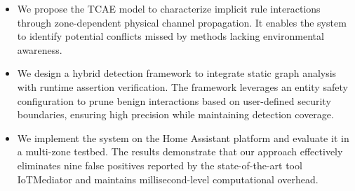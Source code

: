 \begin{itemize}
	\item We propose the TCAE model to characterize implicit rule interactions through zone-dependent physical channel propagation. It enables the system to identify potential conflicts missed by methods lacking environmental awareness.
	
	\item We design a hybrid detection framework to integrate static graph analysis with runtime assertion verification. The framework leverages an entity safety configuration to prune benign interactions based on user-defined security boundaries, ensuring high precision while maintaining detection coverage.
	
	\item We implement the system on the Home Assistant platform and evaluate it in a multi-zone testbed. The results demonstrate that our approach effectively eliminates nine false positives reported by the state-of-the-art tool IoTMediator and maintains millisecond-level computational overhead.



\end{itemize}